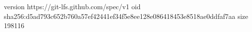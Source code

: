 version https://git-lfs.github.com/spec/v1
oid sha256:d5ad793c652b760a57ef42441ef34f5e8ee128e086418453e8518ae0ddfaf7aa
size 198116
